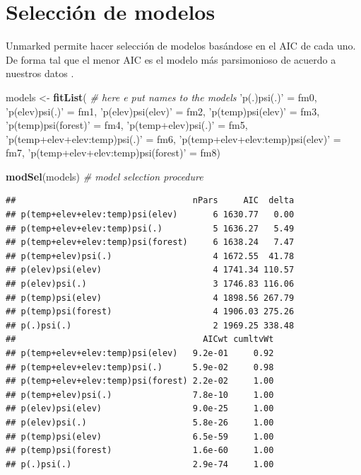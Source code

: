 \documentclass[
]{book}
\newenvironment{Shaded}{\begin{snugshade}}{\end{snugshade}}
\newcommand{\CommentTok}[1]{\textcolor[rgb]{0.56,0.35,0.01}{\textit{#1}}}
\newcommand{\KeywordTok}[1]{\textcolor[rgb]{0.13,0.29,0.53}{\textbf{#1}}}
\newcommand{\NormalTok}[1]{#1}
\newcommand{\StringTok}[1]{\textcolor[rgb]{0.31,0.60,0.02}{#1}}
\begin{document}
\hypertarget{selecciuxf3n-de-modelos}{%
\section{Selección de modelos}\label{selecciuxf3n-de-modelos}}

Unmarked permite hacer selección de modelos basándose en el AIC de cada uno. De forma tal que el menor AIC es el modelo más parsimonioso de acuerdo a nuestros datos \citep{Burnham2004}.

\begin{Shaded}
\begin{Highlighting}[]
\NormalTok{models <-}\StringTok{ }\KeywordTok{fitList}\NormalTok{( }\CommentTok{# here e put names to the models}
  \StringTok{'p(.)psi(.)'}\NormalTok{                        =}\StringTok{ }\NormalTok{fm0,}
  \StringTok{'p(elev)psi(.)'}\NormalTok{                     =}\StringTok{ }\NormalTok{fm1,}
  \StringTok{'p(elev)psi(elev)'}\NormalTok{                  =}\StringTok{ }\NormalTok{fm2,}
  \StringTok{'p(temp)psi(elev)'}\NormalTok{                  =}\StringTok{ }\NormalTok{fm3,}
  \StringTok{'p(temp)psi(forest)'}\NormalTok{                =}\StringTok{ }\NormalTok{fm4,}
  \StringTok{'p(temp+elev)psi(.)'}\NormalTok{                =}\StringTok{ }\NormalTok{fm5,}
  \StringTok{'p(temp+elev+elev:temp)psi(.)'}\NormalTok{      =}\StringTok{ }\NormalTok{fm6,}
  \StringTok{'p(temp+elev+elev:temp)psi(elev)'}\NormalTok{   =}\StringTok{ }\NormalTok{fm7,}
  \StringTok{'p(temp+elev+elev:temp)psi(forest)'}\NormalTok{ =}\StringTok{ }\NormalTok{fm8)}

\KeywordTok{modSel}\NormalTok{(models) }\CommentTok{# model selection procedure}
\end{Highlighting}
\end{Shaded}

\begin{verbatim}
##                                   nPars     AIC  delta
## p(temp+elev+elev:temp)psi(elev)       6 1630.77   0.00
## p(temp+elev+elev:temp)psi(.)          5 1636.27   5.49
## p(temp+elev+elev:temp)psi(forest)     6 1638.24   7.47
## p(temp+elev)psi(.)                    4 1672.55  41.78
## p(elev)psi(elev)                      4 1741.34 110.57
## p(elev)psi(.)                         3 1746.83 116.06
## p(temp)psi(elev)                      4 1898.56 267.79
## p(temp)psi(forest)                    4 1906.03 275.26
## p(.)psi(.)                            2 1969.25 338.48
##                                     AICwt cumltvWt
## p(temp+elev+elev:temp)psi(elev)   9.2e-01     0.92
## p(temp+elev+elev:temp)psi(.)      5.9e-02     0.98
## p(temp+elev+elev:temp)psi(forest) 2.2e-02     1.00
## p(temp+elev)psi(.)                7.8e-10     1.00
## p(elev)psi(elev)                  9.0e-25     1.00
## p(elev)psi(.)                     5.8e-26     1.00
## p(temp)psi(elev)                  6.5e-59     1.00
## p(temp)psi(forest)                1.6e-60     1.00
## p(.)psi(.)                        2.9e-74     1.00
\end{verbatim}
\end{document}
